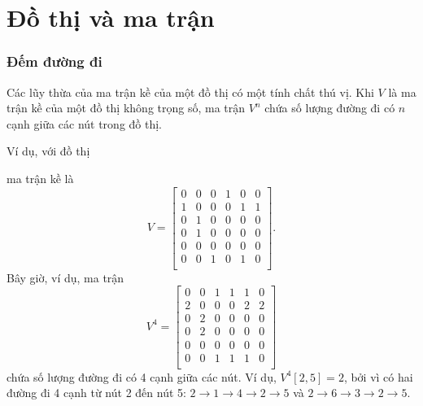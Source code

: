 \section{Đồ thị và ma trận}

\subsubsection{Đếm đường đi}

Các lũy thừa của ma trận kề của một đồ thị
có một tính chất thú vị.
Khi $V$ là ma trận kề của một đồ thị không trọng số,
ma trận $V^n$ chứa số lượng đường đi có
$n$ cạnh giữa các nút trong đồ thị.

Ví dụ, với đồ thị
\begin{center}
\end{center}
ma trận kề là
\[
V= \begin{bmatrix}
  0 & 0 & 0 & 1 & 0 & 0 \\
  1 & 0 & 0 & 0 & 1 & 1 \\
  0 & 1 & 0 & 0 & 0 & 0 \\
  0 & 1 & 0 & 0 & 0 & 0 \\
  0 & 0 & 0 & 0 & 0 & 0 \\
  0 & 0 & 1 & 0 & 1 & 0 \\
 \end{bmatrix}.
\]
Bây giờ, ví dụ, ma trận
\[
V^4= \begin{bmatrix}
  0 & 0 & 1 & 1 & 1 & 0 \\
  2 & 0 & 0 & 0 & 2 & 2 \\
  0 & 2 & 0 & 0 & 0 & 0 \\
  0 & 2 & 0 & 0 & 0 & 0 \\
  0 & 0 & 0 & 0 & 0 & 0 \\
  0 & 0 & 1 & 1 & 1 & 0 \\
 \end{bmatrix}
\]
chứa số lượng đường đi có 4 cạnh
giữa các nút.
Ví dụ, $V^4[2,5]=2$,
bởi vì có hai đường đi 4 cạnh
từ nút 2 đến nút 5:
$2 \rightarrow 1 \rightarrow 4 \rightarrow 2 \rightarrow 5$
và
$2 \rightarrow 6 \rightarrow 3 \rightarrow 2 \rightarrow 5$.

